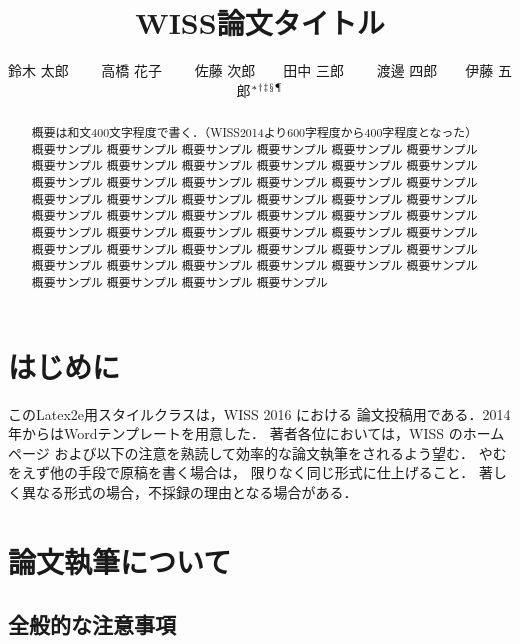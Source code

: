\documentclass[twoside]{wiss}
\begin{document}
\title{WISS論文タイトル}
\etitle{}%
%
%
%
\author{鈴木 太郎 　　高橋 花子
　　佐藤 次郎　　田中 三郎
　　渡邊 四郎　　伊藤 五郎${}^* {}^\dag {}^\ddag {}^\mathsection
{}^\mathparagraph$}

\begin{abstract}
概要は和文400文字程度で書く．（WISS2014より600字程度から400字程度となった）
概要サンプル 概要サンプル 概要サンプル 概要サンプル 概要サンプル 概要サンプル
概要サンプル 概要サンプル 概要サンプル 概要サンプル 概要サンプル 概要サンプル
概要サンプル 概要サンプル 概要サンプル 概要サンプル 概要サンプル 概要サンプル
概要サンプル 概要サンプル 概要サンプル 概要サンプル 概要サンプル 概要サンプル
概要サンプル 概要サンプル 概要サンプル 概要サンプル 概要サンプル 概要サンプル
概要サンプル 概要サンプル 概要サンプル 概要サンプル 概要サンプル 概要サンプル
概要サンプル 概要サンプル 概要サンプル 概要サンプル 概要サンプル 概要サンプル
概要サンプル 概要サンプル 概要サンプル 概要サンプル 概要サンプル 概要サンプル
概要サンプル 概要サンプル 概要サンプル 概要サンプル
\end{abstract}

\maketitle

\section{はじめに}

このLatex2e用スタイルクラスは，WISS 2016 における
論文投稿用である．2014年からはWordテンプレートを用意した．
著者各位においては，WISS のホームページ\cite{wiss}
および以下の注意を熟読して効率的な論文執筆をされるよう望む．
やむをえず他の手段で原稿を書く場合は，
限りなく同じ形式に仕上げること．
著しく異なる形式の場合，不採録の理由となる場合がある．

\section{論文執筆について}

\subsection{全般的な注意事項}
\end{document}
